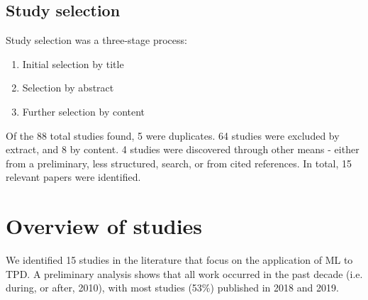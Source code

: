 \documentclass{article}
\begin{document}

\subsection{Study selection}

Study selection was a three-stage process:

\begin{enumerate}
	\item Initial selection by title
	\item Selection by abstract
	\item Further selection by content
\end{enumerate}

Of the 88 total studies found, 5 were duplicates. 64 studies were excluded by extract, and 8 by content. 4 studies were discovered through other means - either from a preliminary, less structured, search, or from cited references. In total, 15 relevant papers were identified.

\section{Overview of studies}

We identified 15 studies in the literature that focus on the application of ML to TPD. A preliminary analysis shows that all work occurred in the past decade (i.e. during, or after, 2010), with most studies (53\%) published in 2018 and 2019.
\end{document}
